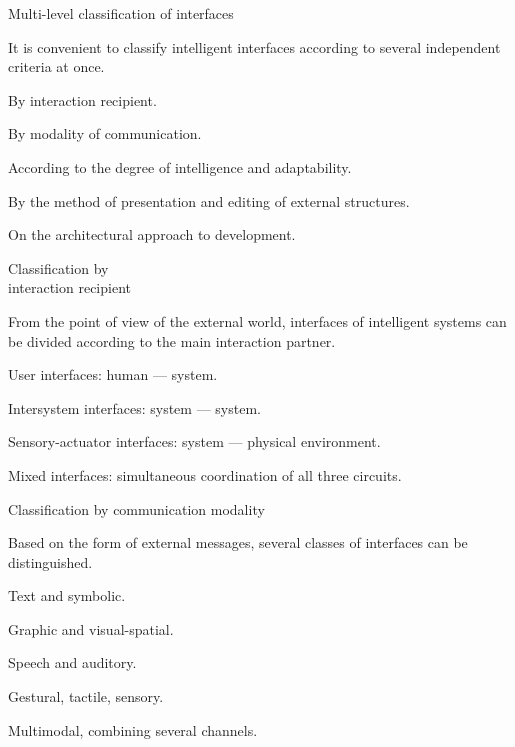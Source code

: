 \begin{frame}{Multi-level classification of interfaces}
	\topline
	\justifying
	
	It is convenient to classify intelligent interfaces according to several independent criteria at once.
	
	\begin{textitemize}
		\item By interaction recipient.
		\item By modality of communication.
		\item According to the degree of intelligence and adaptability.
		\item By the method of presentation and editing of external structures.
		\item On the architectural approach to development.
	\end{textitemize}
\end{frame}

\begin{frame}{Classification by\\ interaction recipient}
	\topline
	\justifying
	
	From the point of view of the external world, interfaces of intelligent systems can be divided according to the main interaction partner.
	
	\begin{textitemize}
		\item User interfaces: human --- system.
		\item Intersystem interfaces: system --- system.
		\item Sensory-actuator interfaces: system --- physical environment.
		\item Mixed interfaces: simultaneous coordination of all three circuits.
	\end{textitemize}
\end{frame}

\begin{frame}{Classification by communication modality}
	\topline
	\justifying
	
	Based on the form of external messages, several classes of interfaces can be distinguished.
	
	\begin{textitemize}
		\item Text and symbolic.
		\item Graphic and visual-spatial.
		\item Speech and auditory.
		\item Gestural, tactile, sensory.
		\item Multimodal, combining several channels.
	\end{textitemize}
\end{frame}

